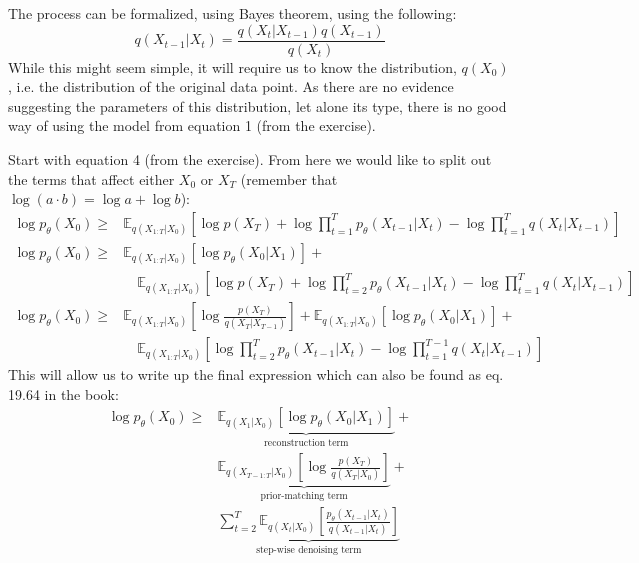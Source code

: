 \documentclass[12pt]{article}    %
\begin{document}

\exminor
The process can be formalized, using Bayes theorem, using the following:
\begin{equation} \label{eq:denoising-bayes}
    q(X_{t-1}|X_t) = \frac{q(X_t|X_{t-1}) q(X_{t-1})}{q(X_t)}
\end{equation}
While this might seem simple, it will require us to know the distribution, $q(X_0)$, i.e. the distribution of the original data point.
As there are no evidence suggesting the parameters of this distribution, let alone its type, there is no good way of using the model from equation 1 (from the exercise).

\exminor
Start with equation 4 (from the exercise).
From here we would like to split out the terms that affect either $X_0$ or $X_T$ (remember that $\log(a \cdot b) = \log a + \log b$):
\begin{align}
    \log p_{\theta}(X_0) \geq& \mathbb{E}_{q(X_{1:T}|X_0)}\left[ \log p(X_T) + \log \prod_{t=1}^{T}p_{\theta}(X_{t-1}|X_t) - \log \prod_{t=1}^{T} q(X_t|X_{t-1}) \right]\\
    \log p_{\theta}(X_0) \geq&\mathbb{E}_{q(X_{1:T}|X_0)} [\log p_{\theta}(X_0|X_1)] + \\
    &\quad \mathbb{E}_{q(X_{1:T}|X_0)}\left[ \log p(X_T) + \log \prod_{t=2}^{T}p_{\theta}(X_{t-1}|X_t) - \log \prod_{t=1}^{T} q(X_t|X_{t-1}) \right]\\
    \log p_{\theta}(X_0) \geq&\mathbb{E}_{q(X_{1:T}|X_0)} \left[ \log \frac{p(X_T)}{q(X_T|X_{T-1})} \right] + \mathbb{E}_{q(X_{1:T}|X_0)} [\log p_{\theta}(X_0|X_1)] +\\
    &\quad \mathbb{E}_{q(X_{1:T}|X_0)}\left[ \log \prod_{t=2}^{T}p_{\theta}(X_{t-1}|X_t) - \log \prod_{t=1}^{T-1} q(X_t|X_{t-1}) \right]
\end{align}
This will allow us to write up the final expression which can also be found as eq. 19.64 in the book:
\begin{align}
    \log p_{\theta}(X_0) \geq &\underbrace{\mathbb{E}_{q(X_{1}|X_0)} [\log p_{\theta}(X_0|X_1)]}_{\text{reconstruction term}} +\\
    &\underbrace{\mathbb{E}_{q(X_{T-1:T}|X_0)} \left[ \log \frac{p(X_T)}{q(X_T|X_{0})} \right]}_{\text{prior-matching term}} + \\
    &\underbrace{\sum_{t=2}^{T}\mathbb{E}_{q(X_{t}|X_0)}\left[\frac{p_{\theta}(X_{t-1}|X_{t})}{q(X_{t-1}|X_{t})} \right]}_{\text{step-wise denoising term}}
\end{align}
\end{document}
